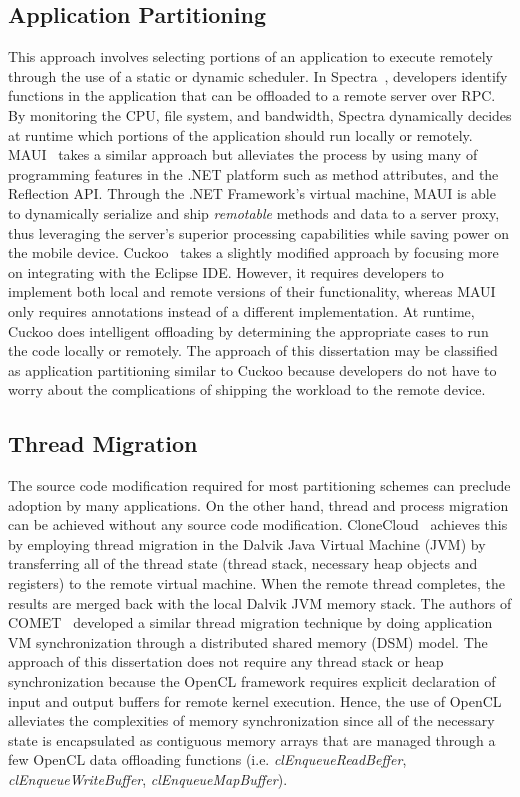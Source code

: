 \subsection{Application Partitioning}
\label{intro:app_partitioning}
%
This approach involves selecting portions of an application to execute
remotely through the use of a static or dynamic scheduler.
%
In Spectra~\cite{spectra}, developers identify functions in the
application that  can be offloaded to a remote server over RPC.
%
By monitoring the CPU, file system, and bandwidth, Spectra dynamically
decides at runtime which portions of the application should run locally
or remotely.
%
MAUI~\cite{maui} takes a similar approach but alleviates the process by
using many of programming features in the .NET platform such as method
attributes, and the Reflection API.
%
Through the .NET Framework's virtual machine, MAUI is able to
dynamically serialize and ship \textit{remotable} methods and data to a
server proxy, thus leveraging the server's superior processing
capabilities while saving power on the mobile device.
%
Cuckoo~\cite{cuckoo} takes a slightly modified approach by focusing more
on integrating with the Eclipse IDE.
%
However, it requires developers to implement both local and remote
versions of their functionality, whereas MAUI only requires annotations
instead of a different implementation.
%
At runtime, Cuckoo does intelligent offloading by determining the
appropriate cases to run the code locally or remotely.
%
The approach of this dissertation may be classified as application partitioning
similar to Cuckoo because developers do not have to worry about the
complications of shipping the workload to the remote device.
%
\subsection{Thread Migration}
\label{intro:thr_migration}
%
The source code modification required for most partitioning schemes can
preclude adoption by many applications.
On the other hand, thread and process migration can be achieved without
any source code modification.
%
CloneCloud~\cite{clonecloud} achieves this by  employing thread
migration in the Dalvik Java Virtual Machine (JVM) by transferring all of
the thread state (thread stack, necessary heap objects and registers) to
the remote virtual machine.
%
When the remote thread completes, the results are merged back with the
local Dalvik JVM memory stack.
%
The authors of COMET~\cite{comet} developed a similar thread migration
technique by doing application VM synchronization through a distributed
shared memory (DSM) model.
%
The approach of this dissertation does not require any thread stack or heap
synchronization because the OpenCL framework requires explicit
declaration of input and output buffers for remote kernel execution.
%
Hence, the use of OpenCL alleviates the complexities of memory
synchronization since all of the necessary state is encapsulated as
contiguous memory arrays that are managed through a few OpenCL data
offloading functions (i.e. \textit{clEnqueueReadBeffer},
\textit{clEnqueueWriteBuffer}, \textit{clEnqueueMapBuffer}).
%

